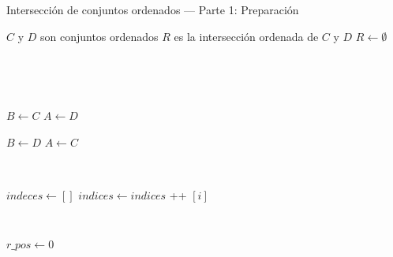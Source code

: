 \begin{algorithm}
\caption{Intersección de conjuntos ordenados — Parte 1: Preparación}
\begin{algorithmic}[1]
\Require $C$ y $D$ son conjuntos ordenados
\Ensure $R$ es la intersección ordenada de $C$ y $D$
    \State $R \gets \emptyset$

        \State {}
    \EndIf

        \State {}
    \EndIf
    
    \
    
        \State {}
    \EndIf
        
    \
    
    \State $B \gets C$
    \State $A \gets D$

        \State $B \gets D$
        \State $A \gets C$
    \EndIf
        
    \
    
    \State $indeces \gets []$ 
        \State $indices \gets indices$  \!+\!+  $[i]$ 
    \EndFor
        
    \
    
    \State $r\_pos \gets 0$
\EndFunction
\end{algorithmic}
\end{algorithm}



